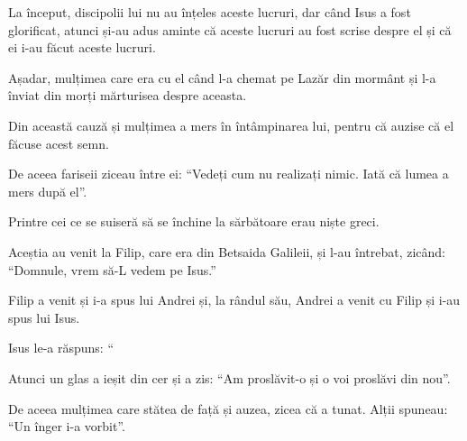 {La început, discipolii lui nu au înțeles aceste lucruri, dar când Isus a fost glorificat, atunci și-au adus aminte că aceste lucruri au fost scrise despre el și că ei i-au făcut aceste lucruri.

Așadar, mulțimea care era cu el când l-a chemat pe Lazăr din mormânt și l-a înviat din morți mărturisea despre aceasta.

Din această cauză și mulțimea a mers în întâmpinarea lui, pentru că auzise că el făcuse acest semn.

De aceea fariseii ziceau între ei: “Vedeți cum nu realizați nimic. Iată că lumea a mers după el”.


\par }{\PP {}Printre cei ce se suiseră să se închine la sărbătoare erau niște greci.

Aceștia au venit la Filip, care era din Betsaida Galileii, și l-au întrebat, zicând: “Domnule, vrem să-L vedem pe Isus.”

Filip a venit și i-a spus lui Andrei și, la rândul său, Andrei a venit cu Filip și i-au spus lui Isus.


\par }{\PP {}Isus le-a răspuns: “{}





\par }{\PP {}


\par }{\PP Atunci un glas a ieșit din cer și a zis: “Am proslăvit-o și o voi proslăvi din nou”.


\par }{\PP {}De aceea mulțimea care stătea de față și auzea, zicea că a tunat. Alții spuneau: “Un înger i-a vorbit”.


}
